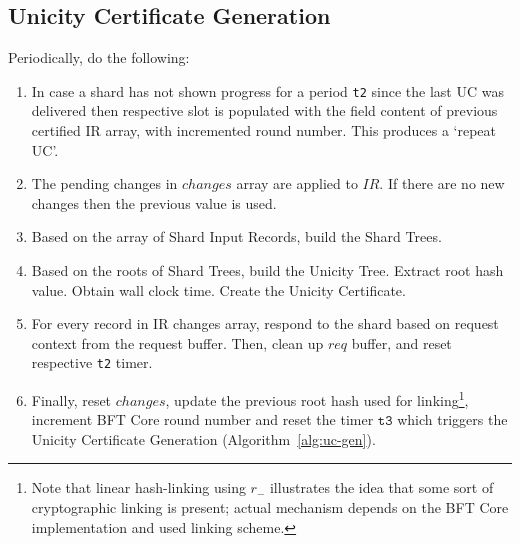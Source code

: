 
\subsection{Unicity Certificate Generation}

Periodically, do the following:
\begin{enumerate}
  \item In case a shard has not shown progress for a period \texttt{t2} since the last UC was delivered then respective slot is  populated with the field content of previous certified IR array, with incremented round number. This produces a `repeat UC'.

  \item The pending changes in $changes$ array are applied to $IR$. If there are no new changes then the previous value is used.

  \item Based on the array of Shard Input Records, build the Shard Trees.

  \item Based on the roots of Shard Trees, build the Unicity Tree. Extract root hash value. Obtain wall clock time. Create the Unicity Certificate.

  \item For every record in IR changes array, respond to the shard based on request context from the request buffer. Then, clean up $req$ buffer, and reset respective \texttt{t2} timer.

  \item Finally, reset $changes$, update the previous root hash used for linking\footnote{Note that linear hash-linking using $r_-$  illustrates the idea that some sort of cryptographic linking is present; actual mechanism depends on the BFT Core implementation and used linking scheme.}, increment BFT Core round number and reset the timer $\mathtt{t3}$ which triggers the Unicity Certificate Generation (Algorithm~\ref{alg:uc-gen}).
\end{enumerate}

